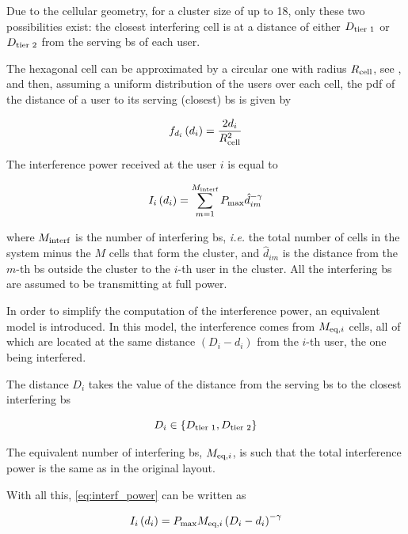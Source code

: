 Due to the cellular geometry, for a cluster size of up to 18, only these two
possibilities exist: the closest interfering cell is at a distance of either
$D_{\text{tier 1}}$ or $D_{\text{tier 2}}$ from the serving \gls{bs} of each user.

The hexagonal cell can be approximated by a circular one with radius $R_{\text{cell}}$,
see , and then, assuming a uniform distribution
of the users over each cell, the \gls{pdf} of the distance of a user to its
serving (closest) \gls{bs} is given by

\begin{equation} \label{eq:pdf_distance}
    f_{d_i}\left(d_i\right) = \frac{2d_i}{R_{\text{cell}}^2}
\end{equation}

The interference power received at the user $i$ is equal to

\begin{equation} \label{eq:interf_power}
    I_i\left( d_i \right) = \sum\limits_{m=1}^{M_{\text{interf}}}P_{\max}
    \hat{d}_{im}^{-\gamma}
\end{equation}

\noindent
where $M_{\text{interf}}$ is the number of interfering \gls{bs}, \emph{i.e.} the total
number of cells in the system minus the $M$ cells that form the cluster, and
$\hat{d}_{im}$ is the distance from the $m$-th \gls{bs} outside the cluster to
the $i$-th user in the cluster. All the interfering \gls{bs} are assumed to be
transmitting at full power.

In order to simplify the computation of the interference power, an equivalent
model is introduced. In this model, the interference comes from $M_{\text{eq},i}$ cells,
all of which are located at the same distance $\left(D_i - d_i\right)$ from the
$i$-th user, the one being interfered. 

The distance $D_i$ takes the value of the distance from the serving \gls{bs} to
the closest interfering \gls{bs}

\begin{equation} \label{eq:interf_min_dist}
    D_i \in \left\{ D_{\text{tier 1}}, D_{\text{tier 2}} \right\}
\end{equation}

The equivalent number of interfering \gls{bs}, $M_{\text{eq},i}$, is such that the total
interference power is the same as in the original layout.

With all this, \eqref{eq:interf_power} can be written as

\begin{equation} \label{eq:interf_power_eq}
    I_i\left(d_i\right) = P_{\max}M_{\text{eq},i}\left(D_i - d_i\right)^{-\gamma}
\end{equation}

